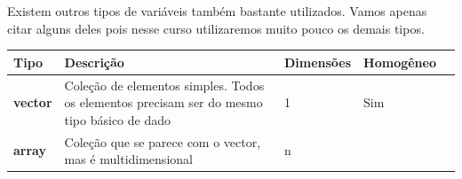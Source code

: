 \documentclass[]{book}
\begin{document}
Existem outros tipos de variáveis também bastante utilizados. Vamos
apenas citar alguns deles pois nesse curso utilizaremos muito pouco os
demais tipos.

\begin{longtable}[]{@{}lllll@{}}
\toprule
\begin{minipage}[b]{0.05\columnwidth}\raggedright\strut
Tipo\strut
\end{minipage} & \begin{minipage}[b]{0.06\columnwidth}\raggedright\strut
Descrição\strut
\end{minipage} & \begin{minipage}[b]{0.05\columnwidth}\raggedright\strut
Dimensões\strut
\end{minipage} & \begin{minipage}[b]{0.05\columnwidth}\raggedright\strut
Homogêneo\strut
\end{minipage} & \begin{minipage}[b]{0.05\columnwidth}\raggedright\strut
\strut
\end{minipage}\tabularnewline
\midrule
\endhead
\begin{minipage}[t]{0.05\columnwidth}\raggedright\strut
\textbf{vector}\strut
\end{minipage} & \begin{minipage}[t]{0.06\columnwidth}\raggedright\strut
Coleção de elementos simples. Todos os elementos precisam ser do mesmo
tipo básico de dado\strut
\end{minipage} & \begin{minipage}[t]{0.05\columnwidth}\raggedright\strut
1\strut
\end{minipage} & \begin{minipage}[t]{0.05\columnwidth}\raggedright\strut
Sim\strut
\end{minipage} & \begin{minipage}[t]{0.05\columnwidth}\raggedright\strut
\strut
\end{minipage}\tabularnewline
\begin{minipage}[t]{0.05\columnwidth}\raggedright\strut
\textbf{array}\strut
\end{minipage} & \begin{minipage}[t]{0.06\columnwidth}\raggedright\strut
Coleção que se parece com o vector, mas é multidimensional\strut
\end{minipage} & \begin{minipage}[t]{0.05\columnwidth}\raggedright\strut
n\strut
\end{minipage} & \begin{minipage}[t]{0.05\columnwidth}\raggedright\strut

\end{minipage}
\end{longtable}
\end{document}
